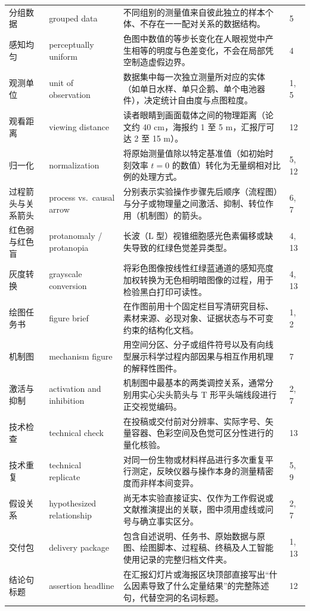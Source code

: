 \begin{longtable}{@{}p{26mm}p{32mm}p{54mm}p{8mm}@{}}
分组数据 & grouped data & 不同组别的测量值来自彼此独立的样本个体、不存在一一配对关系的数据结构。 & 5 \\
感知均匀 & perceptually uniform & 色图中数值的等步长变化在人眼视觉中产生相等的明度与色差变化，不会在局部凭空制造虚假边界。 & 4 \\
观测单位 & unit of observation & 数据集中每一次独立测量所对应的实体（如单日水样、单只企鹅、单个电池器件），决定统计自由度与点图粒度。 & 1, 5 \\
观看距离 & viewing distance & 读者眼睛到画面载体之间的物理距离（论文约 40 cm，海报约 1 至 5 m，汇报厅可达 2 至 15 m）。 & 12 \\
归一化 & normalization & 将原始测量值除以特定基准值（如初始时刻效率 $t=0$ 的数值）转化为无量纲相对比例的处理方式。 & 5, 12 \\
过程箭头与关系箭头 & process vs.\ causal arrow & 分别表示实验操作步骤先后顺序（流程图）与分子或物理量之间激活、抑制、转位作用（机制图）的箭头。 & 6, 7 \\
红色弱与红色盲 & protanomaly / protanopia & 长波（L 型）视锥细胞感光色素偏移或缺失导致的红绿色觉差异类型。 & 4, 13 \\
灰度转换 & grayscale conversion & 将彩色图像按线性红绿蓝通道的感知亮度加权转换为无色相明暗图像的过程，用于检验黑白打印可读性。 & 4, 13 \\
绘图任务书 & figure brief & 在作图前用十个固定栏目写清研究目标、素材来源、必现对象、证据状态与不可变约束的结构化文档。 & 1, 2 \\
机制图 & mechanism figure & 用空间分区、分子或组件符号以及有向线型展示科学过程内部因果与相互作用机理的解释性图件。 & 7 \\
激活与抑制 & activation and inhibition & 机制图中最基本的两类调控关系，通常分别用实心尖头箭头与 T 形平头端线段进行正交视觉编码。 & 2, 7 \\
技术检查 & technical check & 在投稿或交付前对分辨率、实际字号、矢量容器、色彩空间及色觉可区分性进行的量化核验。 & 13 \\
技术重复 & technical replicate & 对同一份生物或材料样品进行多次重复平行测定，反映仪器与操作本身的测量精密度而非样本间变异。 & 5, 9 \\
假设关系 & hypothesized relationship & 尚无本实验直接证实、仅作为工作假说或文献推演提出的关联，图中须用虚线或问号与确立事实区分。 & 2, 7 \\
交付包 & delivery package & 包含自述说明、任务书、原始数据与原图、绘图脚本、过程稿、终稿及人工智能使用记录的完整归档文件夹。 & 1, 13 \\
结论句标题 & assertion headline & 在汇报幻灯片或海报区块顶部直接写出“什么因素导致了什么定量结果”的完整陈述句，代替空洞的名词标题。 & 12 \\

\end{longtable}
